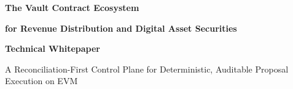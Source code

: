 \documentclass[10pt]{article}
\begin{document}
\sloppy %

\begin{titlepage}


    \noindent\colorbox{GigaIris}{\parbox{\dimexpr\textwidth\relax}{\rule{0pt}{1.0cm}}}

    \vspace{0.7cm}

    \begin{center}

        {\Huge \color{GigaMov} \textbf{The Vault Contract Ecosystem}}

        {\large \color{GigaMov}\textbf{for Revenue Distribution and Digital Asset Securities}}

        \vspace{0.5cm}

        {\large \color{GigaBlackTxt}\textbf{Technical Whitepaper}}

        {\color{GigaBlackTxt}A Reconciliation-First Control Plane for Deterministic, Auditable Proposal Execution on EVM}



\end{center}
\end{titlepage}
\end{document}
